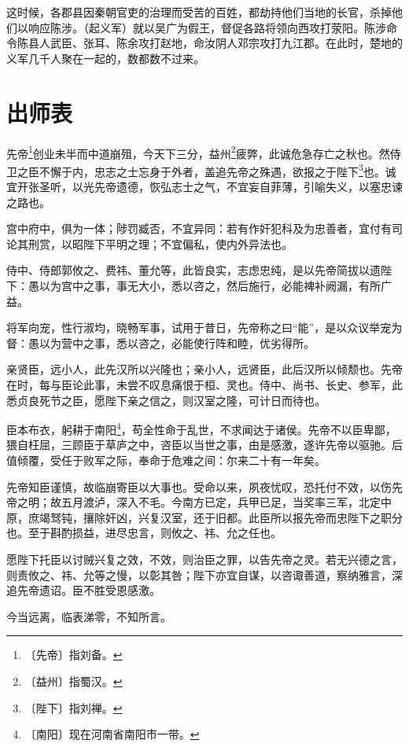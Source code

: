 \documentclass[12pt,UTF-8,openany]{ctexbook}
\begin{document}
\begin{normalsize}
    这时候，各郡县因秦朝官吏的治理而受苦的百姓，都劫持他们当地的长官，杀掉他们以响应陈涉。（起义军）就以吴广为假王，督促各路将领向西攻打荥阳。陈涉命令陈县人武臣、张耳、陈余攻打赵地，命汝阴人邓宗攻打九江郡。在此时，楚地的义军几千人聚在一起的，数都数不过来。
    
\end{normalsize}



\chapter{出师表}

\begin{normalsize}
    
    先帝\footnote{〔先帝〕指刘备。}创业未半而中道崩殂，今天下三分，益州\footnote{〔益州〕指蜀汉。}疲弊，此诚危急存亡之秋也。然侍卫之臣不懈于内，忠志之士忘身于外者，盖追先帝之殊遇，欲报之于陛下\footnote{〔陛下〕指刘禅。}也。诚宜开张圣听，以光先帝遗德，恢弘志士之气，不宜妄自菲薄，引喻失义，以塞忠谏之路也。
    
    宫中府中，俱为一体；陟罚臧否，不宜异同：若有作奸犯科及为忠善者，宜付有司论其刑赏，以昭陛下平明之理；不宜偏私，使内外异法也。
    
    侍中、侍郎郭攸之、费祎、董允等，此皆良实，志虑忠纯，是以先帝简拔以遗陛下：愚以为宫中之事，事无大小，悉以咨之，然后施行，必能裨补阙漏，有所广益。
    
    将军向宠，性行淑均，晓畅军事，试用于昔日，先帝称之曰“能”，是以众议举宠为督：愚以为营中之事，悉以咨之，必能使行阵和睦，优劣得所。
    
    亲贤臣，远小人，此先汉所以兴隆也；亲小人，远贤臣，此后汉所以倾颓也。先帝在时，每与臣论此事，未尝不叹息痛恨于桓、灵也。侍中、尚书、长史、参军，此悉贞良死节之臣，愿陛下亲之信之，则汉室之隆，可计日而待也。
    
    臣本布衣，躬耕于南阳\footnote{〔南阳〕现在河南省南阳市一带。}，苟全性命于乱世，不求闻达于诸侯。先帝不以臣卑鄙，猥自枉屈，三顾臣于草庐之中，咨臣以当世之事，由是感激，遂许先帝以驱驰。后值倾覆，受任于败军之际，奉命于危难之间：尔来二十有一年矣。
    
    先帝知臣谨慎，故临崩寄臣以大事也。受命以来，夙夜忧叹，恐托付不效，以伤先帝之明；故五月渡泸，深入不毛。今南方已定，兵甲已足，当奖率三军，北定中原，庶竭驽钝，攘除奸凶，兴复汉室，还于旧都。此臣所以报先帝而忠陛下之职分也。至于斟酌损益，进尽忠言，则攸之、祎、允之任也。
    
    愿陛下托臣以讨贼兴复之效，不效，则治臣之罪，以告先帝之灵。若无兴德之言，则责攸之、祎、允等之慢，以彰其咎；陛下亦宜自谋，以咨诹善道，察纳雅言，深追先帝遗诏。臣不胜受恩感激。
    
    今当远离，临表涕零，不知所言。
\end{normalsize}
\end{document}
